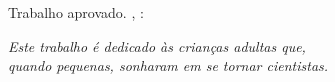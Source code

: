 \documentclass[
12pt, %
openright, %
oneside, %
a4paper, %
english, %
brazil, %
]{abntex2}
\begin{document}

%
\begin{folhadeaprovacao}

  \begin{center}
    {\ABNTEXchapterfont\large\imprimirautor}

    \vspace*{\fill}\vspace*{\fill}
    {\ABNTEXchapterfont\bfseries\Large\imprimirtitulo}
    \vspace*{\fill}
    
    \hspace{.45\textwidth}
    \begin{minipage}{.5\textwidth}
        \imprimirpreambulo
    \end{minipage}%
    \vspace*{\fill}
   \end{center}
    
   Trabalho aprovado. \imprimirlocal, \imprimirdata:

      
   \begin{center}
    \vspace*{0.5cm}
    {\large\imprimirlocal}
    \par
    {\large\imprimirdata}
    \vspace*{1cm}
  \end{center}
  
\end{folhadeaprovacao}

\begin{dedicatoria}
   \vspace*{\fill}
   \centering
   \noindent
   \textit{ Este trabalho é dedicado às crianças adultas que,\\
   quando pequenas, sonharam em se tornar cientistas.} \vspace*{\fill}
\end{dedicatoria}
\end{document}
